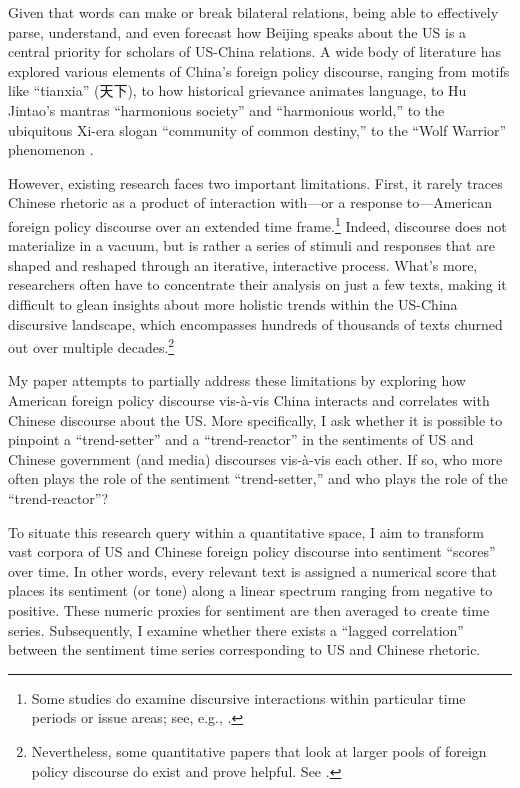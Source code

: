 \documentclass[12pt,letterpaper]{article}
\begin{document}
Given that words can make or break bilateral relations, being able to effectively parse, understand, and even forecast how Beijing speaks about the US is a central priority for scholars of US-China relations. A wide body of literature has explored various elements of China's foreign policy discourse, ranging from motifs like ``tianxia'' (天下), to how historical grievance animates language, to Hu Jintao's mantras ``harmonious society'' and ``harmonious world,'' to the ubiquitous Xi-era slogan ``community of common destiny,'' to the ``Wolf Warrior'' phenomenon \autocites{callahan2007}{zheng2007}{wang2014}{sullivan2023}.

However, existing research faces two important limitations. First, it rarely traces Chinese rhetoric as a product of interaction with---or a response to---American foreign policy discourse over an extended time frame.\footnote{Some studies do examine discursive interactions within particular time periods or issue areas; see, e.g., \textcite[295]{jaworsky2021}.} Indeed, discourse does not materialize in a vacuum, but is rather a series of stimuli and responses that are shaped and reshaped through an iterative, interactive process. What's more, researchers often have to concentrate their analysis on just a few texts, making it difficult to glean insights about more holistic trends within the US-China discursive landscape, which encompasses hundreds of thousands of texts churned out over multiple decades.\footnote{Nevertheless, some quantitative papers that look at larger pools of foreign policy discourse do exist and prove helpful. See \textcite{mokry2024}.}

My paper attempts to partially address these limitations by exploring how American foreign policy discourse vis-à-vis China interacts and correlates with Chinese discourse about the US. More specifically, I ask whether it is possible to pinpoint a ``trend-setter'' and a ``trend-reactor'' in the sentiments of US and Chinese government (and media) discourses vis-à-vis each other. If so, who more often plays the role of the sentiment ``trend-setter,'' and who plays the role of the ``trend-reactor''?

To situate this research query within a quantitative space, I aim to transform vast corpora of US and Chinese foreign policy discourse into sentiment ``scores'' over time. In other words, every relevant text is assigned a numerical score that places its sentiment (or tone) along a linear spectrum ranging from negative to positive. These numeric proxies for sentiment are then averaged to create time series. Subsequently, I examine whether there exists a ``lagged correlation'' between the sentiment time series corresponding to US and Chinese rhetoric.
\end{document}
